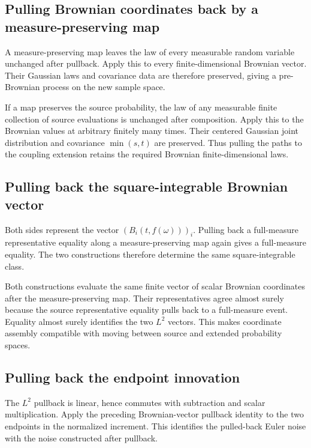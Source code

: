 \documentclass[11pt,a4paper]{article}
\begin{document}
\subsection{\texorpdfstring{Pulling Brownian coordinates back by a measure-preserving map}{Pulling Brownian coordinates back by a measure-preserving map}}


A measure-preserving map leaves the law of every measurable random variable unchanged after pullback. Apply this to every finite-dimensional Brownian vector. Their Gaussian laws and covariance data are therefore preserved, giving a pre-Brownian process on the new sample space.



If a map preserves the source probability, the law of any measurable finite collection of source evaluations is unchanged after composition. Apply this to the Brownian values at arbitrary finitely many times. Their centered Gaussian joint distribution and covariance \(\min(s,t)\) are preserved. Thus pulling the paths to the coupling extension retains the required Brownian finite-dimensional laws.


\subsection{\texorpdfstring{Pulling back the square-integrable Brownian vector}{Pulling back the square-integrable Brownian vector}}


Both sides represent the vector \((B_i(t,f(\omega)))_i\). Pulling back a full-measure representative equality along a measure-preserving map again gives a full-measure equality. The two constructions therefore determine the same square-integrable class.



Both constructions evaluate the same finite vector of scalar Brownian coordinates after the measure-preserving map. Their representatives agree almost surely because the source representative equality pulls back to a full-measure event. Equality almost surely identifies the two \(L^2\) vectors. This makes coordinate assembly compatible with moving between source and extended probability spaces.


\subsection{\texorpdfstring{Pulling back the endpoint innovation}{Pulling back the endpoint innovation}}


The \(L^2\) pullback is linear, hence commutes with subtraction and scalar multiplication. Apply the preceding Brownian-vector pullback identity to the two endpoints in the normalized increment. This identifies the pulled-back Euler noise with the noise constructed after pullback.
\end{document}
